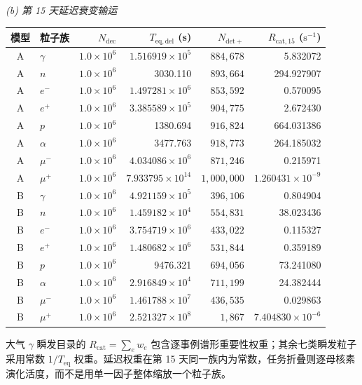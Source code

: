 \documentclass[11pt]{article}
\newcommand{\revblue}[1]{\textcolor{revisionblue}{#1}}
\begin{document}
\begin{table}[!htbp]
\vspace{0.45em}
\noindent\textit{(b) 第 15 天延迟衰变输运}\par\vspace{0.20em}
\begin{tabular}{clrrrr}
\toprule
模型 & 粒子族 & $N_{\mathrm{dec}}$ & $T_{\mathrm{eq,del}}$ (s)
& $N_{\mathrm{det+}}$ & $R_{\mathrm{cat},15}$ ($\mathrm{s^{-1}}$) \\
\midrule
A & $\gamma$ & $1.0\times10^6$ & $1.516919\times10^5$ & $884{,}678$ & 5.832072 \\
A & $n$ & $1.0\times10^6$ & 3030.110 & $893{,}664$ & 294.927907 \\
A & $e^-$ & $1.0\times10^6$ & $1.497281\times10^6$ & $853{,}592$ & 0.570095 \\
A & $e^+$ & $1.0\times10^6$ & $3.385589\times10^5$ & $904{,}775$ & 2.672430 \\
A & $p$ & $1.0\times10^6$ & 1380.694 & $916{,}824$ & 664.031386 \\
A & $\alpha$ & $1.0\times10^6$ & 3477.763 & $918{,}773$ & 264.185032 \\
A & $\mu^-$ & $1.0\times10^6$ & $4.034086\times10^6$ & $871{,}246$ & 0.215971 \\
A & $\mu^+$ & $1.0\times10^6$ & $7.933795\times10^{14}$ & $1{,}000{,}000$ & $1.260431\times10^{-9}$ \\
\addlinespace[0.25em]
B & $\gamma$ & $1.0\times10^6$ & $4.921159\times10^5$ & $396{,}106$ & 0.804904 \\
B & $n$ & $1.0\times10^6$ & $1.459182\times10^4$ & $554{,}831$ & 38.023436 \\
B & $e^-$ & $1.0\times10^6$ & $3.754719\times10^6$ & $433{,}022$ & 0.115327 \\
B & $e^+$ & $1.0\times10^6$ & $1.480682\times10^6$ & $531{,}844$ & 0.359189 \\
B & $p$ & $1.0\times10^6$ & 9476.321 & $694{,}056$ & 73.241080 \\
B & $\alpha$ & $1.0\times10^6$ & $2.916849\times10^4$ & $711{,}199$ & 24.382444 \\
B & $\mu^-$ & $1.0\times10^6$ & $1.461788\times10^7$ & $436{,}535$ & 0.029863 \\
B & $\mu^+$ & $1.0\times10^6$ & $2.521327\times10^8$ & $1{,}867$ & $7.404830\times10^{-6}$ \\
\bottomrule
\end{tabular}

\vspace{0.35em}
\parbox{0.97\linewidth}{\raggedright \revblue{大气 $\gamma$ 瞬发目录}的 $R_{\mathrm{cat}}=\sum_e w_e$ 包含逐事例谱形重要性权重；其余七类瞬发粒子采用常数 $1/T_{\mathrm{eq}}$ 权重。延迟权重在第 15 天同一族内为常数，任务折叠则逐母核素演化活度，而不是用单一因子整体缩放一个粒子族。}
\end{table}
\endgroup
\end{document}
